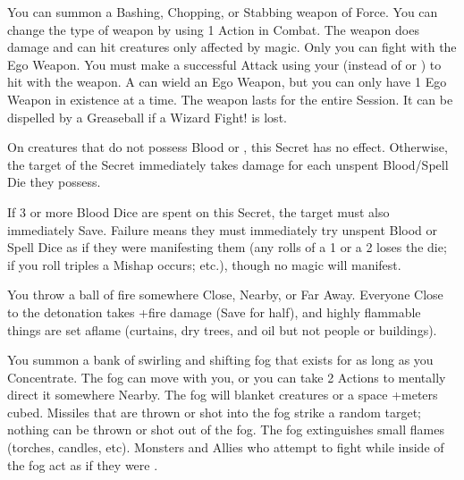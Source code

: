 \WIZARDRY[
  Name=Ego Weapon,
  Link=secrets-ego-weapon,
  Alignment=Mind,
  Save=N,
  Duration=Session,
  Counter=\mylink{Greaseball}{secrets-greaseball} ,
  Keywords=None,
  Target=Self
]

You can summon a Bashing, Chopping, or Stabbing weapon of Force.  You can change the type of weapon by using 1 Action in Combat.  The weapon does \DICE damage and can hit creatures only affected by magic.  Only you can fight with the Ego Weapon.   You must make a successful Attack using your \INT (instead of \VIG or \DEX) to hit with the weapon.  A  can wield an Ego Weapon, but you can only have 1 Ego Weapon in existence at a time.  The weapon lasts for the entire Session.  It can be dispelled by a Greaseball if a Wizard Fight! is lost.

\WIZARDRY[
  Name=Enervate,
  Link=secrets-enervate,
  Alignment=Entropy,
  Save=Y (half),
  Duration=0,
  Counter=None ,
  Keywords=None,
  Target=Close or Nearby Magical Monster
]

On creatures that do not possess Blood or , this Secret has no effect.  Otherwise, the target of the Secret immediately takes \DICE damage for each unspent Blood/Spell Die they possess.

If 3 or more Blood Dice are spent on this Secret, the target must also immediately Save. Failure means they must immediately try  unspent Blood or Spell Dice as if they were manifesting them (any rolls of a 1 or a 2 loses the die; if you roll triples a Mishap occurs; etc.), though no magic will manifest.



\WIZARDRY[
  Name=Fireball,
  Link=secrets-fireball,
  Alignment=Elements,
  Save=Y (half),
  Duration=0,
  Counter=None ,
  Keywords=None,
  Target=Any point
]

You throw a ball of fire somewhere Close, Nearby, or Far Away.  Everyone Close to the detonation takes \SUMDICE+\DICE fire damage (Save for half), and highly flammable things are set aflame (curtains, dry trees, and oil but not people or buildings).




\WIZARDRY[
  Name=Fogbank,
  Link=secrets-fogbank,
  Alignment=Elements,
  Save=N,
  Duration=Concentration,
  Counter=\mylink{Mighty Lungs}{secrets-mighty-lungs} ,
  Keywords=None,
  Target=Close
]



You summon a bank of swirling and shifting fog that exists for as long as you Concentrate.  The fog can move with you, or you can take 2 Actions to mentally direct it somewhere Nearby.  The fog will blanket \SUMDICE creatures or a space \DICE+\DICE meters cubed.  Missiles that are thrown or shot into the fog strike a random target; nothing can be thrown or shot out of the fog.  The fog extinguishes small flames (torches, candles, etc). Monsters and Allies who attempt to fight while inside of the fog act as if they were .


